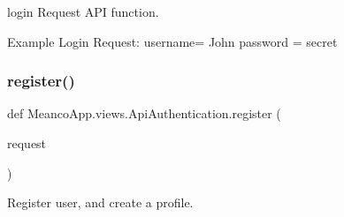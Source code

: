 login Request A\+PI function. 

Example Login Request\+: username= John password = secret \hypertarget{namespace_meanco_app_1_1views_1_1_api_authentication_af77e576094ba5aac7cb8bb6ec321aecc}{}\label{namespace_meanco_app_1_1views_1_1_api_authentication_af77e576094ba5aac7cb8bb6ec321aecc} 
\subsubsection{\texorpdfstring{register()}{register()}}
{\footnotesize\ttfamily def Meanco\+App.\+views.\+Api\+Authentication.\+register (\begin{DoxyParamCaption}\item[{}]{request }\end{DoxyParamCaption})}



Register user, and create a profile. 

